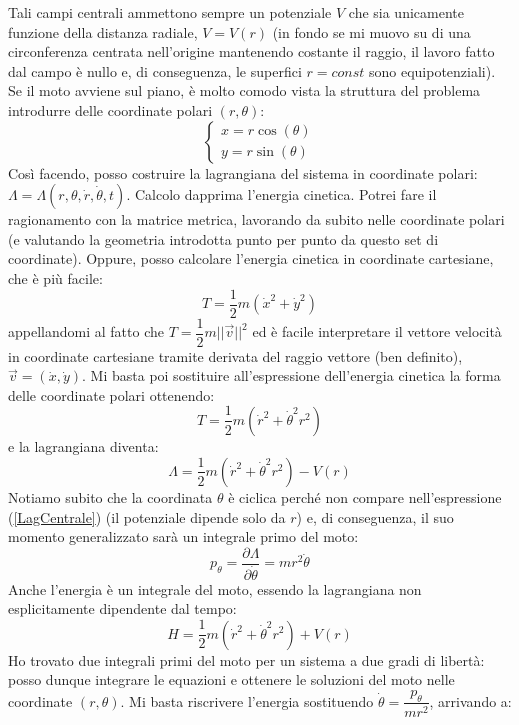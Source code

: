 \documentclass[a4paper,openany]{article}
\begin{document}
	Tali campi centrali ammettono sempre un potenziale $V$ che sia unicamente funzione della distanza radiale, $V=V(r)$ (in fondo se mi muovo su di una circonferenza centrata nell'origine mantenendo costante il raggio, il lavoro fatto dal campo è nullo e, di conseguenza, le superfici $r=const$ sono equipotenziali). Se il moto avviene sul piano, è molto comodo vista la struttura del problema introdurre delle coordinate polari $(r,\theta)$:
	\begin{equation}
		\begin{cases}
			x = r\cos(\theta) \\
			y = r\sin(\theta)
		\end{cases}
	\end{equation}
	Così facendo, posso costruire la lagrangiana del sistema in coordinate polari: $\Lambda = \Lambda(r,\theta,\dot{r},\dot{\theta},t)$. Calcolo dapprima l'energia cinetica. Potrei fare il ragionamento con la matrice metrica, lavorando da subito nelle coordinate polari (e valutando la geometria introdotta punto per punto da questo set di coordinate). Oppure, posso calcolare l'energia cinetica in coordinate cartesiane, che è più facile:
	$$
	T=\dfrac{1}{2}m(\dot{x}^{2}+\dot{y}^{2})
	$$
	appellandomi al fatto che $T= \dfrac{1}{2}m||\vec{v}||^{2}$ ed è facile interpretare il vettore velocità in coordinate cartesiane tramite derivata del raggio vettore (ben definito), $\vec{v}=(\dot{x},\dot{y})$. Mi basta poi sostituire all'espressione dell'energia cinetica la forma delle coordinate polari ottenendo:
	$$
	T=\dfrac{1}{2}m(\dot{r}^{2} + \dot{\theta}^{2}r^{2})
	$$
	e la lagrangiana diventa:
	\begin{equation}
		\Lambda = \dfrac{1}{2}m(\dot{r}^{2} + \dot{\theta}^{2}r^{2}) - V(r)
		\label{LagCentrale}
	\end{equation}
	Notiamo subito che la coordinata $\theta$ è ciclica perché non compare nell'espressione (\ref{LagCentrale}) (il potenziale dipende solo da $r$) e, di conseguenza, il suo momento generalizzato sarà un integrale primo del moto:
	\begin{equation}
		p_{\theta} = \dfrac{\partial \Lambda}{\partial \dot{\theta}} = mr^{2}\dot{\theta}
	\end{equation}
	Anche l'energia è un integrale del moto, essendo la lagrangiana non esplicitamente dipendente dal tempo:
	\begin{equation}
		H = \dfrac{1}{2}m(\dot{r}^{2} + \dot{\theta}^{2}r^{2}) + V(r)
	\end{equation}
	Ho trovato due integrali primi del moto per un sistema a due gradi di libertà: posso dunque integrare le equazioni e ottenere le soluzioni del moto nelle coordinate $(r,\theta)$. Mi basta riscrivere l'energia sostituendo $\dot{\theta}=\dfrac{p_{\theta}}{mr^{2}}$, arrivando a:
\end{document}
